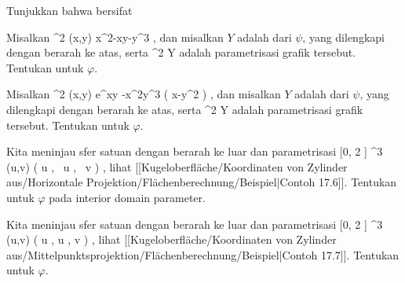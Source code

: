 \setcounter{section}{19}


{}
{

Tunjukkan bahwa
bersifat

}
{} {}

{}
{

Misalkan
\maabbeledisp {\psi} {\R^2} {\R
} {(x,y)} { x^2-xy-y^3
} {,}
dan misalkan $Y$ adalah
dari $\psi$, yang dilengkapi dengan
berarah ke atas, serta
 {\R^2} {Y
} {}
adalah parametrisasi grafik tersebut. Tentukan
untuk $\varphi$.

}
{} {}

{}
{

Misalkan
\maabbeledisp {\psi} {\R^2} {\R
} {(x,y)} { e^{xy} -x^2y^3  \sin  \left(  x-y^2 \right)
} {,}
dan misalkan $Y$ adalah
dari $\psi$, yang dilengkapi dengan
berarah ke atas, serta
 {\R^2} {Y
} {}
adalah parametrisasi grafik tersebut. Tentukan
untuk $\varphi$.

}
{} {}

{}
{

Kita meninjau sfer satuan dengan
berarah ke luar dan parametrisasi
\maabbeledisp {\varphi} {[0, 2 \pi] \times [-1,1]} {\R^3
} {(u,v)} { \left(    \cos  u   , \,     \sin  u  , \,   v                 \right)
} {,}
lihat
[[Kugeloberfläche/Koordinaten von Zylinder aus/Horizontale Projektion/Flächenberechnung/Beispiel|Contoh 17.6]].
Tentukan
untuk $\varphi$ pada interior domain parameter.

}
{} {}

{}
{

Kita meninjau sfer satuan dengan
berarah ke luar dan parametrisasi
\maabbeledisp {\varphi} {[0, 2 \pi] \times \R} {\R^3
} {(u,v)} { {  }  ( \cos  u  ,  \sin  u  , v )
} {,}
lihat
[[Kugeloberfläche/Koordinaten von Zylinder aus/Mittelpunktsprojektion/Flächenberechnung/Beispiel|Contoh 17.7]].
Tentukan
untuk $\varphi$.

}
{} {}

